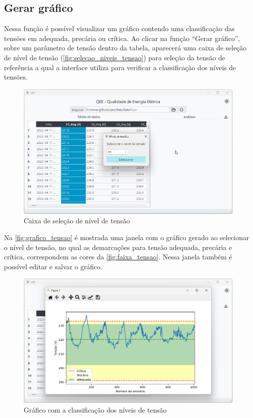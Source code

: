 \subsection{Gerar gráfico}

Nessa função é possível visualizar um gráfico contendo uma classificação das tensões em adequada, precária ou crítica. Ao clicar na função “Gerar gráfico”, sobre um parâmetro de tensão dentro da tabela, aparecerá uma caixa de seleção de nível de tensão (\autoref{fig:selecao_niveis_tensao}) para seleção da tensão de referência a qual a interface utiliza para verificar a classificação dos níveis de tensões.

\begin{figure}[H]
  \centering
  \caption{Caixa de seleção de nível de tensão}
  \label{fig:selecao_niveis_tensao}
  \includegraphics[width=15cm]{illustrations/figures/selecao_niveis_tensao.png}
\end{figure}

Na \autoref{fig:grafico_tensao} é mostrada uma janela com o gráfico gerado ao selecionar o nível de tensão, no qual as demarcações para tensão adequada, precária e crítica, correspondem as cores da \autoref{fig:faixa_tensao}. Nessa janela também é possível editar e salvar o gráfico.

\begin{figure}[H]
  \centering
  \caption{Gráfico com a classificação dos níveis de tensão}
  \label{fig:grafico_tensao}
  \includegraphics[width=15cm]{illustrations/figures/grafico_tensao.png}
\end{figure}

